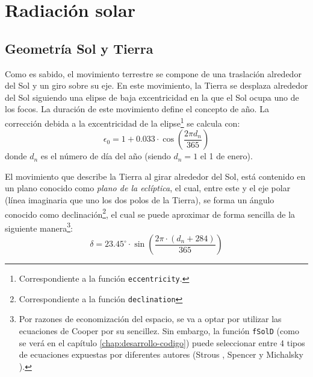 \section{Radiación solar}
\label{sec:orge1dcd2a}
\label{radiacion-solar}
\subsection{Geometría Sol y Tierra}
\label{sec:org458830d}
Como es sabido, el movimiento terrestre se compone de una traslación alrededor del Sol y un giro sobre su eje. En este movimiento, la Tierra se desplaza alrededor del Sol siguiendo una elipse de baja excentricidad en la que el Sol ocupa uno de los focos. La duración de este movimiento define el concepto de año. La corrección debida a la excentricidad de la elipse\footnote{Correspondiente a la función \texttt{eccentricity}.} se calcula con: 
\begin{equation}
\epsilon_0=1+0.033\cdot \cos(\frac{2\pi d_n}{365})
\end{equation}
donde \(d_n\) es el número de día del año (siendo \(d_n=1\) el 1 de enero). 

El movimiento que describe la Tierra al girar alrededor del Sol, está contenido en un plano conocido como \emph{plano de la eclíptica}, el cual, entre este y el eje polar (línea imaginaria que uno los dos polos de la Tierra), se forma un ángulo conocido como declinación\footnote{Correspondiente a la función \texttt{declination}}, el cual se puede aproximar de forma sencilla de la siguiente manera\footnote{Por razones de economización del espacio, se va a optar por utilizar las ecuaciones de Cooper \cite{Cooper1969} por su sencillez. Sin embargo, la función \texttt{fSolD} (como se verá en el capítulo \ref{chap:desarrollo-codigo}) puede seleccionar entre 4 tipos de ecuaciones expuestas por diferentes autores (Strous \cite{Strous2011}, Spencer \cite{Spencer1971} y Michalsky \cite{Michalsky1988}).}: 
\begin{equation}
\delta=23.45^\circ \cdot \sin(\frac{2\pi \cdot (d_n+284)}{365})
\end{equation}


